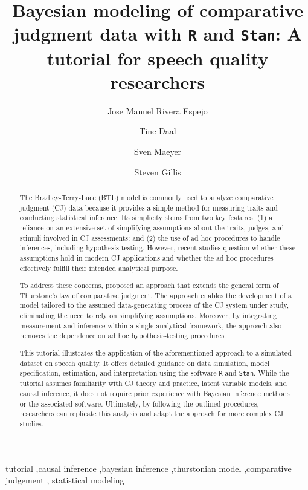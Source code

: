 \documentclass[
  authoryear,
  review,
  1p]{elsarticle}
\begin{document}
\begin{frontmatter}
\title{Bayesian modeling of comparative judgment data with \texttt{R}
and \texttt{Stan}: A tutorial for speech quality researchers}
\author[1]{Jose Manuel Rivera Espejo%
%
}
\author[1]{Tine Daal%
%
}
\author[1]{Sven Maeyer%
%
}
\author[2]{Steven Gillis%
%
}






        
\begin{abstract}
The Bradley-Terry-Luce (BTL) model is commonly used to analyze
comparative judgment (CJ) data because it provides a simple method for
measuring traits and conducting statistical inference. Its simplicity
stems from two key features: (1) a reliance on an extensive set of
simplifying assumptions about the traits, judges, and stimuli involved
in CJ assessments; and (2) the use of ad hoc procedures to handle
inferences, including hypothesis testing. However, recent studies
question whether these assumptions hold in modern CJ applications and
whether the ad hoc procedures effectively fulfill their intended
analytical purpose.

To address these concerns, \citet{Rivera_et_al_2025} proposed an
approach that extends the general form of Thurstone's law of comparative
judgment. The approach enables the development of a model tailored to
the assumed data-generating process of the CJ system under study,
eliminating the need to rely on simplifying assumptions. Moreover, by
integrating measurement and inference within a single analytical
framework, the approach also removes the dependence on ad hoc
hypothesis-testing procedures.

This tutorial illustrates the application of the aforementioned approach
to a simulated dataset on speech quality. It offers detailed guidance on
data simulation, model specification, estimation, and interpretation
using the software \texttt{R} and \texttt{Stan}. While the tutorial
assumes familiarity with CJ theory and practice, latent variable models,
and causal inference, it does not require prior experience with Bayesian
inference methods or the associated software. Ultimately, by following
the outlined procedures, researchers can replicate this analysis and
adapt the approach for more complex CJ studies.
\end{abstract}





\begin{keyword}
    tutorial \sep causal inference \sep bayesian
inference \sep thurstonian model \sep comparative judgement \sep 
    statistical modeling
\end{keyword}
\end{frontmatter}
    
\end{document}

